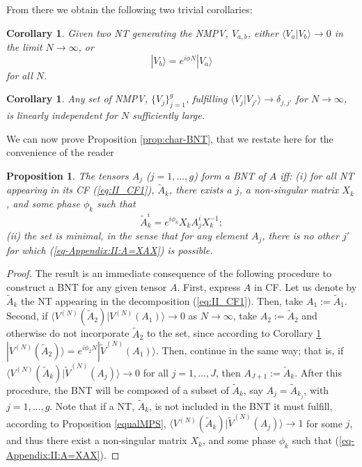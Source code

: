 \documentclass{elsarticle}
\newcommand{\be}{\begin{equation}}
\newcommand{\ee}{\end{equation}}
\newtheorem*{prop*}{Proposition}
\newtheorem{cor}[thm]{Corollary}
\begin{document}
From there we obtain the following two trivial corollaries:

\begin{cor}
\label{eqV}
Given two NT generating the NMPV, $V_{a,b}$, either $\langle V_a|V_b\rangle \to 0$ in the limit $N\to \infty$, or
 \be
 |V_b\rangle = e^{i\phi N} |V_a\rangle
 \ee
for all $N$.
\end{cor}

\begin{cor}
\label{Lem1}
Any set of NMPV, $\{V_j\}_{j=1}^g$, fulfilling $\langle V_j|V_{j'}\rangle\to \delta_{j,j'}$ for $N\to\infty$, is linearly independent for $N$ sufficiently large.
\end{cor}

We can now prove Proposition \ref{prop:char-BNT}, that we restate here for the convenience of the reader

\begin{prop*}
The tensors $A_j$ ($j=1,\ldots,g$) form a BNT of $A$ iff: (i) for all NT appearing in its CF (\ref{eq:II_CF1}), $\tilde A_k$, there exists a $j$, a non-singular matrix $X_k$, and some phase $\phi_k$ such that \be
 \label{eq-Appendix:II:A=XAX}
 \tilde A^i_k=e^{i\phi_k} X_k A^i_j X_k^{-1};
 \ee (ii) the set is minimal, in the sense that for any element $A_j$, there is no other $j'$ for which (\ref{eq-Appendix:II:A=XAX}) is possible.
\end{prop*}

\begin{proof}
The result is an immediate consequence of the following procedure to construct a BNT for any given tensor $A$. First, express $A$ in CF. Let us denote by $\tilde A_k$ the NT appearing in the decomposition (\ref{eq:II_CF1}). Then, take $A_1:=\tilde A_1$. Second, if $\langle V^{(N)}(\tilde A_2)|V^{(N)}(A_1)\rangle\to 0$ as $N\to \infty$, take $A_2:=\tilde  A_2$ and otherwise do not incorporate $\tilde  A_2$ to the set, since according to Corollary \ref{eqV} $|V^{(N)}(\tilde A_2)\rangle = e^{i \phi_2 N} |\tilde V^{(N)}(A_1)\rangle$. Then, continue in the same way; that is, if $\langle V^{(N)}(\tilde A_k)|\tilde V^{(N)}(A_j)\rangle\to 0$ for all $j=1,\ldots,J$, then $A_{J+1}:=\tilde A_k$. After this procedure, the BNT will be composed of a subset of $\tilde A_k$, say $A_j=\tilde{A}_{k_j}$, with $j=1,\ldots,g$. Note that if a NT, $\tilde A_k$, is not included in the BNT it must fulfill, according to Proposition \ref{equalMPS}, $\langle V^{(N)}(\tilde A_k)|\tilde V^{(N)}(A_j)\rangle\to 1$ for some $j$, and thus there exist a non-singular matrix $X_k$, and some phase $\phi_k$ such that (\ref{eq-Appendix:II:A=XAX}).
\end{proof}
\end{document}
